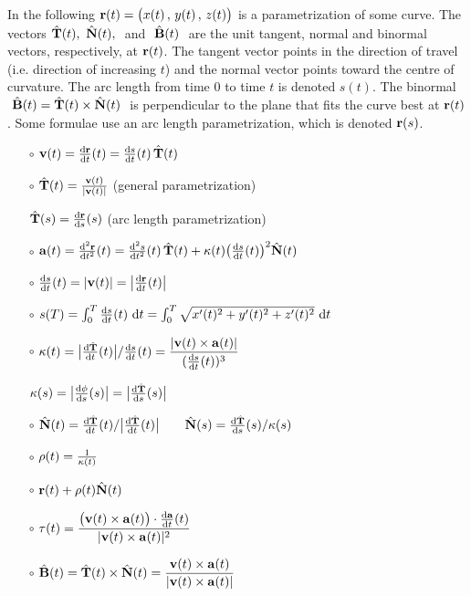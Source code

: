 In the following $\mathbf{r}(t)=\big(x(t)\,,\,y(t)\,,\,z(t)\big)$ 
is a parametrization of some curve. The vectors $\hat{\mathbf{T}}(t),\ \hat{\mathbf{N}}(t),\ $ 
and $\ \hat{\mathbf{B}}(t)\ $ are the unit tangent,
normal and binormal vectors, respectively, at $\mathbf{r}(t)$. The tangent 
vector points in the  direction of travel (i.e. direction of increasing 
$t$)  and the normal vector points toward the  centre of curvature. 
The arc length from time $0$ to time $t$ is denoted $s(t)$. 
The binormal $\ \hat{\mathbf{B}}(t)=\hat{\mathbf{T}}(t)\times \hat{\mathbf{N}}(t)\ $ is perpendicular to the plane that fits the curve best at $\mathbf{r}(t)$.
Some formulae use an arc length parametrization, which is denoted
$\mathbf{r}(s)$.
\begin{itemize}\itemsep1pt \parskip0pt  %
\item[$\circ$]  
$
\vv(t)=\diff{\vr}{t}(t)=\diff{s}{t}(t)\,\hat\vT(t)
$
\medskip
\item[$\circ$]  
$
\hat{\mathbf{T}}(t)=\frac{\mathbf{v}(t)}{|\mathbf{v}(t)|}
$ \qquad(general parametrization)
\item[] \makebox[2in][l]{ } 
$
\hat\vT(s)=\diff{\vr}{s}(s)
$ \qquad(arc length parametrization)
\medskip
\item[$\circ$]  
$
\va(t)=\difftwo{\vr}{t}(t)=\difftwo{s}{t}(t)\,\hat\vT(t)
                             +\ka(t)\big(\diff{s}{t}(t)\big)^2\hat\vN(t)
$
\medskip
\item[$\circ$]  
$
\diff{s}{t}(t) = |\vv(t)| = \big|\diff{\vr}{t}(t)\big|
$
\medskip
\item[$\circ$]  
$
s(T) = \int_0^T \diff{s}{t}(t)\ \dee{t} 
     = \int_0^T \sqrt{x'(t)^2+y'(t)^2+z'(t)^2}\ \dee{t}
$
\medskip
\item[$\circ$]  
$
\ka(t)
= \big|\diff{\hat\vT}{t}(t)\big|/\diff{s}{t}(t)
=\displaystyle{ \frac{|\vv(t)\times\va(t)|}{(\diff{s}{t}(t))^3} }
$
\item[] \makebox[2in][l]{  }
$
\ka(s)
= \big|\diff{\phi}{s}(s)\big|
= \big|\diff{\hat\vT}{s}(s)\big|
$
\medskip
\item[$\circ$]  
$
\hat\vN(t) = \diff{\hat\vT}{t}(t)/\big|\diff{\hat\vT}{t}(t)\big|
\qquad
\hat\vN(s) = \diff{\hat\vT}{s}(s)/\ka(s)
$

\medskip
\item[$\circ$]  
$
\rho(t)=\frac{1}{\kappa(t)}
$
\medskip
\item[$\circ$]  
$
\mathbf{r}(t)+\rho(t)\hat{\mathbf{N}}(t)
$
\medskip
\item[$\circ$]  
$\displaystyle
\tau(t)=\frac{\big(\vv(t)\times\va(t)\big) \cdot \diff{\va}{t}(t)}
             {|\vv(t)\times\va(t)|^2}
$
\medskip
\item[$\circ$]  
$\displaystyle
\hat{\mathbf{B}}(t)=\hat{\mathbf{T}}(t)\times \hat{\mathbf{N}}(t)=\frac{\mathbf{v}(t)\times\mathbf{a}(t)}{|\mathbf{v}(t)\times\mathbf{a}(t)|}
$
\end{itemize}
